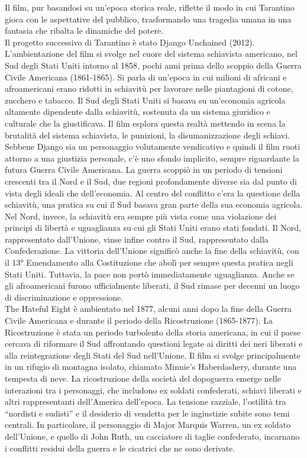 \documentclass[12pt]{article} %
\begin{document}
\begin{flushleft}
    Il film, pur basandosi su un’epoca storica reale, riflette il modo in cui Tarantino gioca con le aspettative del pubblico, trasformando una tragedia umana in una fantasia che ribalta le dinamiche del potere.
    \\\vspace{1cm}
    Il progetto successivo di Tarantino è stato Django Unchained (2012). L'ambientazione del film si svolge nel cuore del sistema schiavista americano, nel Sud degli Stati Uniti intorno al 1858, pochi anni prima dello scoppio della Guerra Civile Americana (1861-1865). Si parla di un’epoca in cui milioni di africani e afroamericani erano ridotti in schiavitù per lavorare nelle piantagioni di cotone, zucchero e tabacco. Il Sud degli Stati Uniti si basava su un'economia agricola altamente dipendente dalla schiavitù, sostenuta da un sistema giuridico e culturale che la giustificava. Il film esplora questa realtà mettendo in scena la brutalità del sistema schiavista, le punizioni, la disumanizzazione degli schiavi.
    Sebbene Django sia un personaggio volutamente vendicativo e quindi il film ruoti attorno a una giustizia personale, c'è uno sfondo implicito, sempre riguardante la futura Guerra Civile Americana. La guerra scoppiò in un periodo di tensioni crescenti tra il Nord e il Sud, due regioni profondamente diverse sia dal punto di vista degli ideali che dell'economia. Al centro del conflitto c’era la questione della schiavitù, una pratica su cui il Sud basava gran parte della sua economia agricola. Nel Nord, invece, la schiavitù era sempre più vista come una violazione dei principi di libertà e uguaglianza su cui gli Stati Uniti erano stati fondati. Il Nord, rappresentato dall'Unione, vinse infine contro il Sud, rappresentato dalla Confederazione.
    La vittoria dell'Unione significò anche la fine della schiavitù, con il 13° Emendamento alla Costituzione che abolì per sempre questa pratica negli Stati Uniti. Tuttavia, la pace non portò immediatamente uguaglianza. Anche se gli afroamericani furono ufficialmente liberati, il Sud rimase per decenni un luogo di discriminazione e oppressione.
    \\\vspace{1cm}
    The Hateful Eight è ambientato nel 1877, alcuni anni dopo la fine della Guerra Civile Americana e durante il periodo della Ricostruzione (1865-1877). La Ricostruzione è stata un periodo turbolento della storia americana, in cui il paese cercava di riformare il Sud affrontando questioni legate ai diritti dei neri liberati e alla reintegrazione degli Stati del Sud nell'Unione. Il film si svolge principalmente in un rifugio di montagna isolato, chiamato Minnie’s Haberdashery, durante una tempesta di neve. La ricostruzione della società del dopoguerra emerge nelle interazioni tra i personaggi, che includono ex soldati confederati, schiavi liberati e altri rappresentanti dell’America dell'epoca. La tensione razziale, l'ostilità tra “nordisti e sudisti” e il desiderio di vendetta per le ingiustizie subite sono temi centrali. In particolare, il personaggio di Major Marquis Warren, un ex soldato dell'Unione, e quello di John Ruth, un cacciatore di taglie confederato, incarnano i conflitti residui della guerra e le cicatrici che ne sono derivate.


\end{flushleft}
\end{document}

